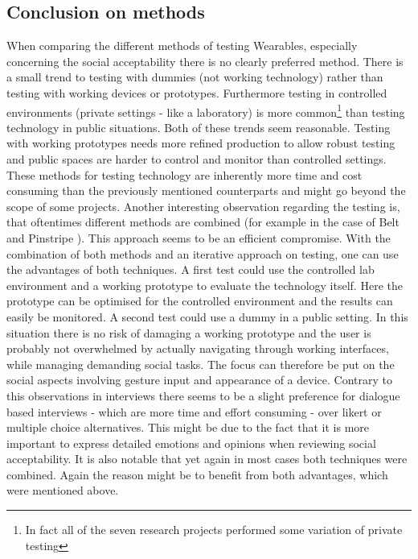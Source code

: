 \documentclass{sigchi}
\begin{document}
\subsection{Conclusion on methods}
When comparing the different methods of testing Wearables, especially concerning the social acceptability there is no clearly preferred method. There is a small trend to testing with dummies (not working technology) rather than testing with working devices or prototypes. Furthermore testing in controlled environments (private settings - like a laboratory) is more common\footnote{In fact all of the seven research projects performed some variation of private testing} than testing technology in public situations. Both of these trends seem reasonable. Testing with working prototypes needs more refined production to allow robust testing and public spaces are harder to control and monitor than controlled settings. These methods for testing technology are inherently more time and cost consuming than the previously mentioned counterparts and might go beyond the scope of some projects.
Another interesting observation regarding the testing is, that oftentimes different methods are combined (for example in the case of Belt \cite{belt} and Pinstripe \cite{pinstripe}). This approach seems to be an efficient compromise. With the combination of both methods and an iterative approach on testing, one can use the advantages of both techniques. A first test could use the controlled lab environment and a working prototype to evaluate the technology itself. Here the prototype can be optimised for the controlled environment and the results can easily be monitored. A second test could use a dummy in a public setting. In this situation there is no risk of damaging a working prototype and the user is probably not overwhelmed by actually navigating through working interfaces, while managing demanding social tasks. The focus can therefore be put on the social aspects involving gesture input and appearance of a device.
Contrary to this observations in interviews there seems to be a slight preference for dialogue based interviews - which are more time and effort consuming - over likert or multiple choice alternatives. This might be due to the fact that it is more important to express detailed emotions and opinions when reviewing social acceptability.
It is also notable that yet again in most cases both techniques were combined. Again the reason might be to benefit from both advantages, which were mentioned above.
\end{document}
